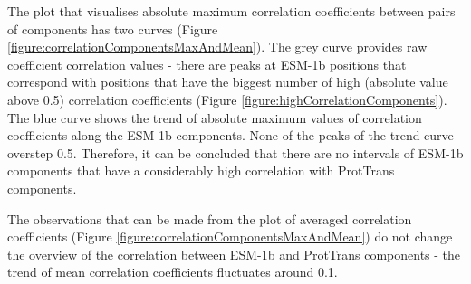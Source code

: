 \documentclass[12pt]{article}
\begin{document}
	\newpage

	The plot that visualises absolute maximum correlation coefficients between 
	pairs of components has two curves (Figure \ref{figure:correlationComponentsMaxAndMean}). 
	The grey curve provides raw coefficient correlation values - there are peaks 
	at ESM-1b positions that correspond with positions that have the 
	biggest number of high (absolute value above 0.5) correlation coefficients
	(Figure \ref{figure:highCorrelationComponents}). The blue curve shows the trend 
	of absolute maximum values of correlation coefficients along the ESM-1b components.
	None of the peaks of the trend curve overstep 0.5. Therefore, it can 
	be concluded that there are no intervals of ESM-1b components that have 
	a considerably high correlation with ProtTrans components.

	The observations that can be made from the plot of averaged correlation 
	coefficients (Figure \ref{figure:correlationComponentsMaxAndMean}) do not change the 
	overview of the correlation between 
	ESM-1b and ProtTrans components - the trend of mean correlation coefficients 
	fluctuates around 0.1.
\end{document}
